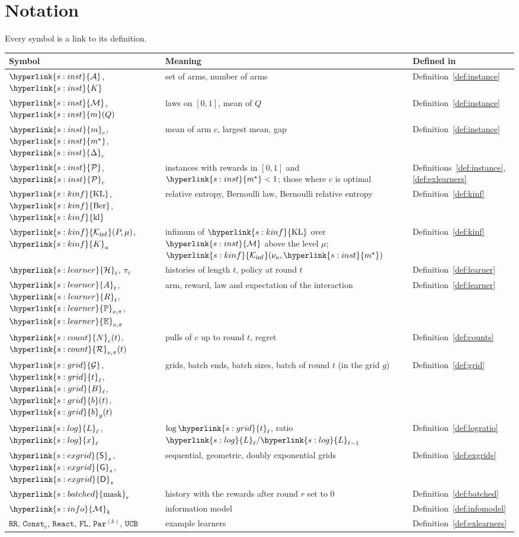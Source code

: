 \documentclass[11pt]{article}
\newcommand{\sy}[2]{{\hyperlink{#1}{#2}}}
\newcommand{\1}{\mathbf{1}}
\newcommand{\Arms}{\sy{s:inst}{\mathcal A}}
\newcommand{\Kar}{\sy{s:inst}{K}}
\newcommand{\Mu}{\sy{s:inst}{\mathcal M}}
\newcommand{\mean}{\sy{s:inst}{m}}
\newcommand{\ms}{\sy{s:inst}{m^\star}}
\newcommand{\Dg}{\sy{s:inst}{\Delta}}
\newcommand{\cP}{\sy{s:inst}{\mathcal P}}
\newcommand{\KL}{\sy{s:kinf}{\mathrm{KL}}}
\newcommand{\Ber}{\sy{s:kinf}{\mathrm{Ber}}}
\newcommand{\kl}{\sy{s:kinf}{\mathrm{kl}}}
\newcommand{\Ki}{\sy{s:kinf}{\mathcal K_{\inf}}}
\newcommand{\Ka}{\sy{s:kinf}{K}}
\newcommand{\Hs}{\sy{s:learner}{\mathcal H}}
\newcommand{\Pnu}{\sy{s:learner}{\mathbb P}}
\newcommand{\Enu}{\sy{s:learner}{\mathbb E}}
\newcommand{\Ac}{\sy{s:learner}{A}}
\newcommand{\Rw}{\sy{s:learner}{R}}
\newcommand{\Ng}{\sy{s:count}{N}}
\newcommand{\Reg}{\sy{s:count}{\mathcal R}}
\newcommand{\Gr}{\sy{s:grid}{\mathcal G}}
\newcommand{\tl}{\sy{s:grid}{t}}
\newcommand{\Bg}{\sy{s:grid}{B}}
\newcommand{\bt}{\sy{s:grid}{b}}
\newcommand{\Lg}{\sy{s:log}{L}}
\newcommand{\xg}{\sy{s:log}{x}}
\newcommand{\Sq}{\sy{s:exgrid}{\mathsf S}}
\newcommand{\Ge}{\sy{s:exgrid}{\mathsf G}}
\newcommand{\Db}{\sy{s:exgrid}{\mathsf D}}
\newcommand{\mask}{\sy{s:batched}{\mathrm{mask}}}
\newcommand{\Mk}[1]{\sy{s:info}{\mathcal M}_{#1}}
\newcommand{\RR}{\hyperref[def:exlearners]{\texttt{RR}}}
\newcommand{\Const}{\hyperref[def:exlearners]{\texttt{Const}}}
\newcommand{\FL}{\hyperref[def:exlearners]{\texttt{FL}}}
\newcommand{\React}{\hyperref[def:exlearners]{\texttt{React}}}
\newcommand{\Par}{\hyperref[def:exlearners]{\texttt{Par}}}
\newcommand{\UCB}{\hyperref[def:exlearners]{\texttt{UCB}}}
\begin{document}
\section{Notation}\label{sec:notation}

Every symbol is a link to its definition.
\begin{center}
\begin{tabular}{@{}p{}p{}p{}@{}}
\toprule
Symbol & Meaning & Defined in \\
\midrule
$\Arms$, $\Kar$ & set of arms, number of arms & Definition~\ref{def:instance} \\
$\Mu$, $\mean(Q)$ & laws on $[0,1]$, mean of $Q$ & Definition~\ref{def:instance} \\
$\mean_c$, $\ms$, $\Dg_c$ & mean of arm $c$, largest mean, gap & Definition~\ref{def:instance} \\
$\cP$, $\cP_c$ & instances with rewards in $[0,1]$ and $\ms<1$; those where $c$ is optimal & Definitions~\ref{def:instance}, \ref{def:exlearners} \\
$\KL$, $\Ber$, $\kl$ & relative entropy, Bernoulli law, Bernoulli relative entropy & Definition~\ref{def:kinf} \\
$\Ki(P,\mu)$, $\Ka_a$ & infimum of $\KL$ over $\Mu$ above the level $\mu$; $\Ki(\nu_a,\ms)$ & Definition~\ref{def:kinf} \\
$\Hs_t$, $\pi_t$ & histories of length $t$, policy at round $t$ & Definition~\ref{def:learner} \\
$\Ac_t$, $\Rw_t$, $\Pnu_{\nu,\pi}$, $\Enu_{\nu,\pi}$ & arm, reward, law and expectation of the interaction & Definition~\ref{def:learner} \\
$\Ng_c(t)$, $\Reg_{\nu,\pi}(t)$ & pulls of $c$ up to round $t$, regret & Definition~\ref{def:counts} \\
$\Gr$, $\tl_\ell$, $\Bg_\ell$, $\bt(t)$, $\bt_g(t)$ & grids, batch ends, batch sizes, batch of round $t$ (in the grid $g$) & Definition~\ref{def:grid} \\
$\Lg_\ell$, $\xg_\ell$ & $\log\tl_\ell$, ratio $\Lg_\ell/\Lg_{\ell-1}$ & Definition~\ref{def:logratio} \\
$\Sq_s$, $\Ge_s$, $\Db_s$ & sequential, geometric, doubly exponential grids & Definition~\ref{def:exgrids} \\
$\mask_r$ & history with the rewards after round $r$ set to $0$ & Definition~\ref{def:batched} \\
$\Mk{k}$ & information model & Definition~\ref{def:infomodel} \\
$\RR$, $\Const_c$, $\React$, $\FL$, $\Par^{(k)}$, $\UCB$ & example learners & Definition~\ref{def:exlearners} \\
\bottomrule
\end{tabular}
\end{center}
\end{document}

